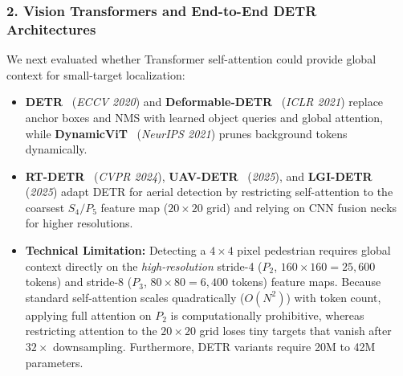\documentclass[11pt,a4paper]{article}
\begin{document}
\subsubsection*{2. Vision Transformers and End-to-End DETR Architectures}
We next evaluated whether Transformer self-attention could provide global context for small-target localization:
\begin{itemize}[leftmargin=1.5em]
    \item \textbf{DETR}~\cite{carion2020detr} (\emph{ECCV 2020}) and \textbf{Deformable-DETR}~\cite{zhu2020deformabledetr} (\emph{ICLR 2021}) replace anchor boxes and NMS with learned object queries and global attention, while \textbf{DynamicViT}~\cite{rao2021dynamicvit} (\emph{NeurIPS 2021}) prunes background tokens dynamically.
    \item \textbf{RT-DETR}~\cite{lv2024rtdetr} (\emph{CVPR 2024}), \textbf{UAV-DETR}~\cite{zhang2025uavdetr} (\emph{2025}), and \textbf{LGI-DETR}~\cite{chen2025lgidetr} (\emph{2025}) adapt DETR for aerial detection by restricting self-attention to the coarsest $S_4/P_5$ feature map ($20\times 20$ grid) and relying on CNN fusion necks for higher resolutions.
    \item \textbf{Technical Limitation:} Detecting a $4\times 4$ pixel pedestrian requires global context directly on the \emph{high-resolution} stride-4 ($P_2$, $160\times 160 = 25,600$ tokens) and stride-8 ($P_3$, $80\times 80 = 6,400$ tokens) feature maps. Because standard self-attention scales quadratically ($O(N^2)$) with token count, applying full attention on $P_2$ is computationally prohibitive, whereas restricting attention to the $20\times 20$ grid loses tiny targets that vanish after $32\times$ downsampling. Furthermore, DETR variants require 20M to 42M parameters.
\end{itemize}
\end{document}
